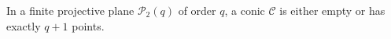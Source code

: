 In a finite projective plane $\mathcal{P}_2(q)$ of order $q$, a conic $\mathcal{C}$ is either empty or has exactly $q + 1$ points.
